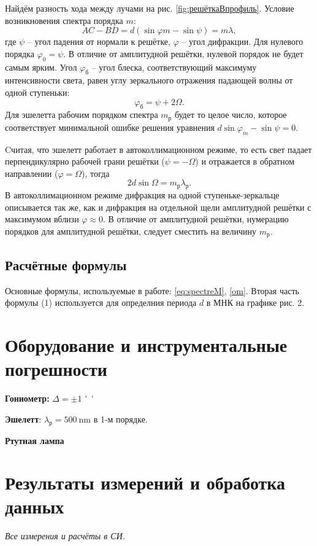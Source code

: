 \documentclass[a4paper]{article}
\newcommand{\Equip}[3]{
	
	{\bf #1:} $\Delta = \pm #2$ \si{#3}}
\newcommand{\equip}[1]{
	
	{\bf #1}}
\begin{document}
Найдём разность хода между лучами на рис. \ref{fig:решёткаВпрофиль}. Условие возникновения спектра порядка $ m $:
\begin{equation}\label{eq:spectreM}
	A C - B D = d (\sin \varphi m- \sin \psi) = m \lambda,
\end{equation}
где $ \psi $ -- угол падения от нормали к решётке, $ \varphi $ -- угол дифракции.
Для нулевого порядка $ \varphi_0 = \psi $. В отличие от амплитудной решётки, нулевой порядок не будет самым ярким. Угол $ \varphi_б $ -- угол блеска, соответствующий максимуму интенсивности света, равен углу зеркального отражения падающей волны от одной ступеньки:
\begin{equation*}\label{key}
	\varphi_б = \psi+ 2 \Omega.
\end{equation*}
Для эшелетта рабочим порядком спектра $  m_р$ будет то целое число, которое соответствует минимальной ошибке решения уравнения $d \sin \varphi_m - \sin \psi = 0 $.

Cчитая, что эшелетт работает в автоколлимационном режиме, то есть свет падает перпендикулярно рабочей грани решётки ($ \psi = -\Omega $) и отражается в обратном направлении ($ \varphi = \Omega $), тогда
\begin{equation}\label{om}
	2 d \sin \Omega = m_р \lambda_р.
\end{equation}
В автоколлимационном режиме дифракция на одной ступеньке-зеркальце описывается так же, как и дифракция на отдельной щели амплитудной решётки с максимумом вблизи $ \varphi \approx 0 $. В отличие от амплитудной решётки, нумерацию порядков для амплитудной решётки, следует сместить на величину $ m_р $.

\subsection{Расчётные формулы}

Основные формулы, используемые в работе: \eqref{eq:spectreM}, \eqref{om}. Вторая часть формулы (1) используется для определния периода $ d $ в МНК на графике рис. 2.

\section{Оборудование и инструментальные погрешности}

\Equip{Гониометр}{1}{''}
\equip{Эшелетт}: $ \lambda_р = \SI{500}{\nano \metre} $ в 1-м порядке.
\equip{Ртутная лампа}

\section{Результаты измерений и обработка данных}
\emph{Все измерения и расчёты в СИ.}
\end{document}
